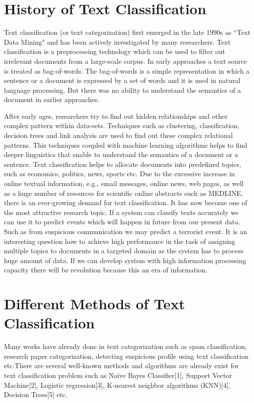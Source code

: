 \documentclass[12pt,a4paper]{report}
\begin{document}
\section{History of Text Classification}
Text classification (or text categorization)  first emerged in the late 1990s as ``Text Data Mining" and has been actively investigated by many researchers. Text classification is a preprocessing technology which can be used to filter out irrelevant documents from a large-scale corpus. In early approaches a text source is treated as bag-of-words. The bag-of-words is a simple representation in which a sentence or a document is expressed by a set of words and it is used in natural language processing. But there was no ability to understand the semantics of a document in earlier approaches.\par
\vspace{.5cm}
After early ages, researchers try to find out hidden relationships and other complex pattern within data-sets. Techniques such as clustering, classification, decision trees and link analysis are used to find out these complex relational patterns. This techniques coupled with machine learning algorithms helps to find deeper linguistics that enable to understand the semantics of a document or a sentence. Text classification helps to allocate documents into predefined topics, such as economics, politics, news, sports etc. Due to the excessive increase in online textual information, e.g., email messages, online news, web pages, as well as a huge number of resources for scientific online abstracts such as MEDLINE, there is an ever-growing demand for text classification. It has now become one of the most attractive research topic. If a system can classify texts accurately we can use it to predict events which will happen in future from our present data. Such as from suspicious communication we may predict a terrorist event. It is an interesting question how to achieve high performance in the task of assigning multiple topics to documents in a targeted domain as the system has to process huge amount of data. If we can develop system with high information processing capacity there will be revolution because this an era of information.


\section{Different Methods of Text Classification}
Many works have already done in text categorization such as spam classification, research paper categorization, detecting suspicious profile using text classification etc.There are several well-known methods and algorithms are already exist for text classification problem such as Naïve Bayes Classifier[1], Support Vector Machine[2], Logistic regression[3], K-nearest neighbor algorithms (KNN)[4], Decision Trees[5] etc.
\end{document}
